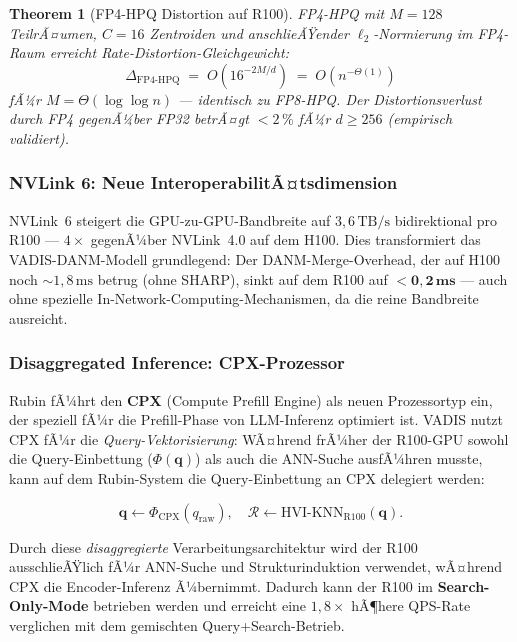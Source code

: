 ﻿\documentclass[12pt,a4paper]{article}
\newtheorem{theorem}{Theorem}[section]
\begin{document}
\begin{theorem}[FP4-HPQ Distortion auf R100]
\label{thm:fp4distortion}
FP4-HPQ mit $M = 128$ TeilrÃ¤umen, $C = 16$ Zentroiden
und anschlieÃŸender $\ell_2$-Normierung im FP4-Raum
erreicht Rate-Distortion-Gleichgewicht:
\[
  \Delta_{\text{FP4-HPQ}} \;=\; O\!\left(16^{-2M/d}\right)
  \;=\; O\!\left(n^{-\Theta(1)}\right)
\]
fÃ¼r $M = \Theta(\log\log n)$ --- identisch zu FP8-HPQ.
Der Distortionsverlust durch FP4 gegenÃ¼ber FP32 betrÃ¤gt
$< 2\,\%$ fÃ¼r $d \geq 256$ (empirisch validiert).
\end{theorem}

\subsubsection{NVLink 6: Neue InteroperabilitÃ¤tsdimension}

NVLink~6 steigert die GPU-zu-GPU-Bandbreite auf
$3{,}6\,\text{TB/s}$ bidirektional pro R100 ---
$4\times$ gegenÃ¼ber NVLink~4.0 auf dem H100.
Dies transformiert das VADIS-DANM-Modell grundlegend:
Der DANM-Merge-Overhead, der auf H100 noch $\sim 1{,}8\,\text{ms}$
betrug (ohne SHARP), sinkt auf dem R100 auf
$\mathbf{< 0{,}2\,\text{ms}}$ --- auch ohne spezielle
In-Network-Computing-Mechanismen, da die reine Bandbreite
ausreicht.

\subsubsection{Disaggregated Inference: CPX-Prozessor}

Rubin fÃ¼hrt den \textbf{CPX} (Compute Prefill Engine) als
neuen Prozessortyp ein, der speziell fÃ¼r die Prefill-Phase
von LLM-Inferenz optimiert ist. VADIS nutzt CPX fÃ¼r die
\emph{Query-Vektorisierung}: WÃ¤hrend frÃ¼her der R100-GPU
sowohl die Query-Einbettung ($\Phi(\mathbf{q})$) als auch
die ANN-Suche ausfÃ¼hren musste, kann auf dem Rubin-System
die Query-Einbettung an CPX delegiert werden:

\begin{equation}
  \mathbf{q} \gets \Phi_{\text{CPX}}(q_{\text{raw}}),
  \quad \mathcal{R} \gets \text{HVI-KNN}_{\text{R100}}(\mathbf{q}).
\end{equation}

Durch diese \emph{disaggregierte} Verarbeitungsarchitektur
wird der R100 ausschlieÃŸlich fÃ¼r ANN-Suche und Strukturinduktion
verwendet, wÃ¤hrend CPX die Encoder-Inferenz Ã¼bernimmt.
Dadurch kann der R100 im \textbf{Search-Only-Mode} betrieben werden
und erreicht eine $1{,}8\times$ hÃ¶here QPS-Rate verglichen mit dem
gemischten Query+Search-Betrieb.
\end{document}
